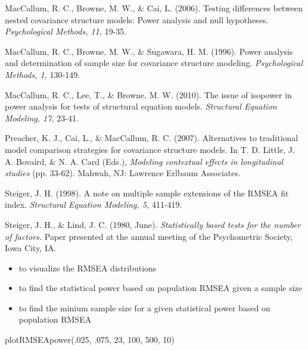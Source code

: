 \documentclass[a4paper]{book}
\begin{document}
\begin{References}\relax
MacCallum, R. C., Browne, M. W., \& Cai, L. (2006). Testing differences between nested covariance structure models: Power analysis and null hypotheses. \emph{Psychological Methods, 11,} 19-35.

MacCallum, R. C., Browne, M. W., \& Sugawara, H. M. (1996). Power analysis and determination of sample size for covariance structure modeling. \emph{Psychological Methods, 1,} 130-149.

MacCallum, R. C., Lee, T., \& Browne, M. W. (2010). The issue of isopower in power analysis for tests of structural equation models. \emph{Structural Equation Modeling, 17,} 23-41.

Preacher, K. J., Cai, L., \& MacCallum, R. C. (2007). Alternatives to traditional model comparison strategies for covariance structure models. In T. D. Little, J. A. Bovaird, \& N. A. Card (Eds.), \emph{Modeling contextual effects in longitudinal studies} (pp. 33-62). Mahwah, NJ: Lawrence Erlbaum Associates.

Steiger, J. H. (1998). A note on multiple sample extensions of the RMSEA fit index. \emph{Structural Equation Modeling, 5,} 411-419.

Steiger, J. H., \& Lind, J. C. (1980, June). \emph{Statistically based tests for the number of factors.} Paper presented at the annual meeting of the Psychometric Society, Iowa City, IA.
\end{References}
%
\begin{SeeAlso}\relax
\begin{itemize}

\item {} to visualize the RMSEA distributions
\item {} to find the statistical power based on population RMSEA given a sample size
\item {} to find the minium sample size for a given statistical power based on population RMSEA

\end{itemize}

\end{SeeAlso}
%
\begin{Examples}
\begin{ExampleCode}
plotRMSEApower(.025, .075, 23, 100, 500, 10)
\end{ExampleCode}
\end{Examples}
\end{document}
